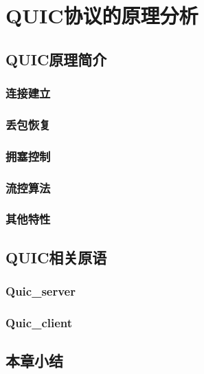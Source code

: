 \chapter{QUIC协议的原理分析}
\section{QUIC原理简介}
\subsection{连接建立}
\subsection{丢包恢复}
\subsection{拥塞控制}
\subsection{流控算法}
\subsection{其他特性}
\section{QUIC相关原语}
\subsection{Quic\_server}
\subsection{Quic\_client}
\section{本章小结}
